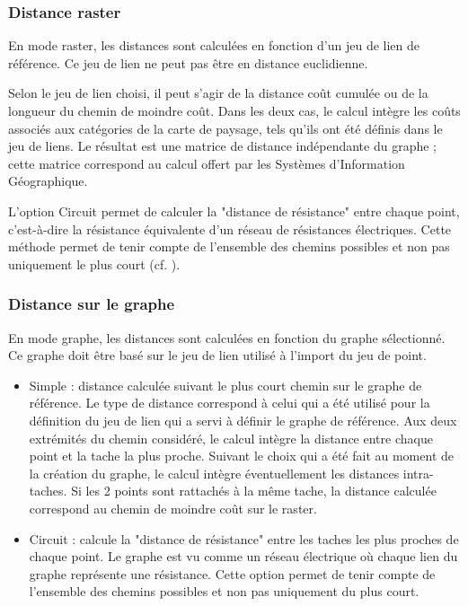 \documentclass{article}
\begin{document}
\subsubsection{Distance raster}
En mode raster, les distances sont calculées en fonction d'un jeu de lien de référence. Ce jeu de lien ne peut pas être en distance euclidienne.

Selon le jeu de lien choisi, il peut s’agir de la distance coût cumulée ou de la longueur du chemin de moindre coût. Dans les deux cas, le calcul intègre les coûts associés aux catégories de la carte de paysage, tels qu’ils ont été définis dans le jeu de liens. Le résultat est une matrice de distance indépendante du graphe ; cette matrice correspond au calcul offert par les Systèmes d’Information Géographique.

L'option Circuit permet de calculer la "distance de résistance" entre chaque point, c'est-à-dire la résistance équivalente d'un réseau de résistances électriques. Cette méthode permet de tenir compte de l'ensemble des chemins possibles et non pas uniquement le plus court (cf. \cite{McRae2008}).


\subsubsection{Distance sur le graphe}

En mode graphe, les distances sont calculées en fonction du graphe sélectionné. Ce graphe doit être basé sur le jeu de lien utilisé à l'import du jeu de point.

\begin{itemize}
	\item Simple : distance calculée suivant le plus court chemin sur le graphe de référence. Le type de distance correspond à celui qui a été utilisé pour la définition du jeu de lien qui a servi à définir le graphe de référence. Aux deux extrémités du chemin considéré, le calcul intègre la distance entre chaque point et la tache la plus proche. Suivant le choix qui a été fait au moment de la création du graphe, le calcul intègre éventuellement les distances intra-taches.	Si les 2 points sont rattachés à la même tache, la distance calculée correspond au chemin de moindre coût sur le raster.
	\item Circuit : calcule la "distance de résistance" entre les taches les plus proches de chaque point. Le graphe est vu comme un réseau électrique où chaque lien du graphe représente une résistance. Cette option permet de tenir compte de l'ensemble des chemins possibles et non pas uniquement du plus court.
\end{itemize}
\end{document}
